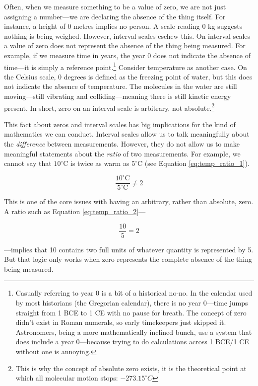 Often, when we measure something to be a value of zero, we are not just assigning a number—we are declaring the absence of the thing itself. For instance, a height of 0 metres implies no person. A scale reading 0 kg suggests nothing is being weighed. However, interval scales eschew this. On interval scales a value of zero does not represent the absence of the thing being measured. For example, if we measure time in years, the year 0 does not indicate the absence of time—it is simply a reference point.\footnote{Casually referring to year 0 is a bit of a historical no-no. In the calendar used by most historians (the Gregorian calendar), there is no year 0—time jumps straight from 1 BCE to 1 CE with no pause for breath. The concept of zero didn’t exist in Roman numerals, so early timekeepers just skipped it. Astronomers, being a more mathematically inclined bunch, use a system that does include a year 0—because trying to do calculations across 1 BCE/1 CE without one is annoying.} Consider temperature as another case. On the Celsius scale, 0 degrees is defined as the freezing point of water, but this does not indicate the absence of temperature. The molecules in the water are still moving—still vibrating and colliding—meaning there is still kinetic energy present. In short, zero on an interval scale is arbitrary, not absolute.\footnote{This is why the concept of absolute zero exists, it is the theoretical point at which all molecular motion stops: $−273.15^\circ C$}

This fact about zeros and interval scales has big implications for the kind of mathematics we can conduct. Interval scales allow us to talk meaningfully about the \textit{difference} between measurements. However, they do not allow us to make meaningful statements about the \textit{ratio} of two measurements. For example, we cannot say that $10^\circ$C is twice as warm as $5^\circ$C (see Equation \ref{eq:temp_ratio_1}).

\begin{equation}
\frac{10^\circ \text{C}}{5^\circ \text{C}} \neq 2
\label{eq:temp_ratio_1}
\end{equation}

\noindent
This is one of the core issues with having an arbitrary, rather than absolute, zero. A ratio such as Equation \ref{eq:temp_ratio_2}—

\begin{equation}
\frac{10}{5} = 2
\label{eq:temp_ratio_2}
\end{equation}

—implies that 10 contains two full units of whatever quantity is represented by 5. But that logic only works when zero represents the complete absence of the thing being measured.

